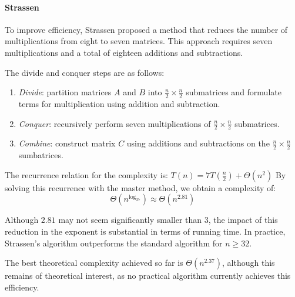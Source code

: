 \paragraph*{Strassen}
To improve efficiency, Strassen proposed a method that reduces the number of multiplications from eight to seven matrices.
This approach requires seven multiplications and a total of eighteen additions and subtractions.

The divide and conquer steps are as follows:
\begin{enumerate}
    \item \textit{Divide}: partition matrices $A$ and $B$ into $\frac{n}{2}\times\frac{n}{2}$ submatrices and formulate terms for multiplication using addition and subtraction.
    \item \textit{Conquer}: recursively perform seven multiplications of $\frac{n}{2}\times\frac{n}{2}$ submatrices.
    \item \textit{Combine}: construct matrix $C$ using additions and subtractions on the $\frac{n}{2}\times\frac{n}{2}$ sumbatrices. 
\end{enumerate}
The recurrence relation for the complexity is: $T(n)=7T\left(\frac{n}{2}\right)+\Theta(n^2)$
By solving this recurrence with the master method, we obtain a complexity of:
\[\Theta\left(n^{\log_27}\right)\approx \Theta\left(n^{2.81}\right)\]

Although $2.81$ may not seem significantly smaller than $3$, the impact of this reduction in the exponent is substantial in terms of running time.
In practice, Strassen's algorithm outperforms the standard algorithm for $n \geq 32$.

The best theoretical complexity achieved so far is $\Theta\left(n^{2.37}\right)$, although this remains of theoretical interest, as no practical algorithm currently achieves this efficiency.